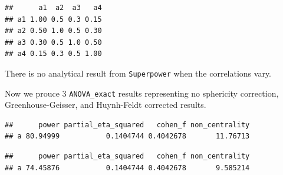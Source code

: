 \documentclass[
]{book}
\newenvironment{Shaded}{\begin{snugshade}}{\end{snugshade}}
\newcommand{\DataTypeTok}[1]{\textcolor[rgb]{0.13,0.29,0.53}{#1}}
\newcommand{\KeywordTok}[1]{\textcolor[rgb]{0.13,0.29,0.53}{\textbf{#1}}}
\newcommand{\NormalTok}[1]{#1}
\newcommand{\OperatorTok}[1]{\textcolor[rgb]{0.81,0.36,0.00}{\textbf{#1}}}
\newcommand{\OtherTok}[1]{\textcolor[rgb]{0.56,0.35,0.01}{#1}}
\newcommand{\StringTok}[1]{\textcolor[rgb]{0.31,0.60,0.02}{#1}}
\begin{document}
\begin{Shaded}
\end{Shaded}

\begin{verbatim}
##      a1  a2  a3   a4
## a1 1.00 0.5 0.3 0.15
## a2 0.50 1.0 0.5 0.30
## a3 0.30 0.5 1.0 0.50
## a4 0.15 0.3 0.5 1.00
\end{verbatim}

There is no analytical result from \texttt{Superpower} when the correlations vary.

Now we prouce 3 \texttt{ANOVA\_exact} results representing no sphericity correction, Greenhouse-Geisser, and Huynh-Feldt corrected results.

\begin{Shaded}
\end{Shaded}

\begin{verbatim}
##      power partial_eta_squared   cohen_f non_centrality
## a 80.94999           0.1404744 0.4042678       11.76713
\end{verbatim}

\begin{Shaded}
\end{Shaded}

\begin{verbatim}
##      power partial_eta_squared   cohen_f non_centrality
## a 74.45876           0.1404744 0.4042678       9.585214
\end{verbatim}
\end{document}
